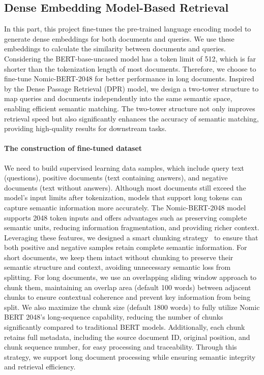 \documentclass[twoside]{article}
\begin{document}
\medskip




\subsection{Dense Embedding Model-Based Retrieval}

In this part, this project fine-tunes the pre-trained language encoding model to generate dense embeddings for both documents and queries.
We use these embeddings to calculate the similarity between documents and queries. Considering the BERT-base-uncased model has a token limit
of 512, which is far shorter than the tokenization length of most documents. Therefore, we choose to fine-tune Nomic-BERT-2048 for better 
performance in long documents. Inspired by the Dense Passage Retrieval (DPR) model, we design a two-tower structure to map queries and
documents independently into the same semantic space, enabling efficient semantic matching. The two-tower structure not only improves 
retrieval speed but also significantly enhances the accuracy of semantic matching, providing high-quality results for downstream tasks.

\paragraph*{The construction of fine-tuned dataset}

We need to build supervised learning data samples, which include query text (questions), positive documents (text containing answers), and 
negative documents (text without answers). Although most documents still exceed the model's input limits after tokenization, models that 
support long tokens can capture semantic information more accurately. The Nomic-BERT-2048 model supports 2048 token inputs and offers 
advantages such as preserving complete semantic units, reducing information fragmentation, and providing richer context. Leveraging these 
features, we designed a smart chunking strategy~\cite{fama2024no} to ensure that both positive and negative samples retain complete semantic information.
For short documents, we keep them intact without chunking to preserve their semantic structure and context, avoiding unnecessary semantic 
loss from splitting. For long documents, we use an overlapping sliding window approach to chunk them, maintaining an overlap area 
(default 100 words) between adjacent chunks to ensure contextual coherence and prevent key information from being split. We also maximize 
the chunk size (default 1800 words) to fully utilize Nomic BERT 2048's long-sequence capability, reducing the number of chunks significantly 
compared to traditional BERT models. Additionally, each chunk retains full metadata, including the source document ID, original position, 
and chunk sequence number, for easy processing and traceability. Through this strategy, we support long document processing while ensuring 
semantic integrity and retrieval efficiency.
\end{document}
